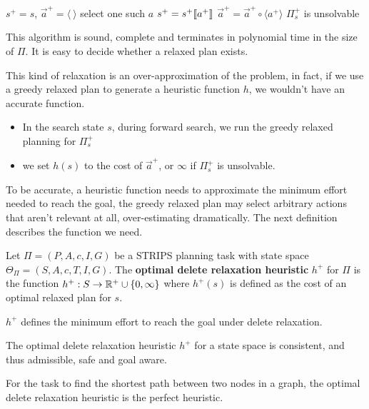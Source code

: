 \documentclass[10pt, letterpaper]{report}
\begin{document}
\begin{algorithm}
\caption{Greedy Relaxed Planning}\label{alg:relaxed_planning}
\begin{algorithmic}[1]
\State $s^+=s$, $\vec a^+=\langle \ \rangle$
\State select one such $a$
\State $s^+=s^+\llbracket a^+ \rrbracket$
\State $\vec a^+=\vec a^+\circ \langle a^+\rangle$
\Else
\State\Return $\Pi^+_s$ is unsolvable
\EndIf
\EndWhile
\end{algorithmic}
\end{algorithm}

This algorithm is sound,  complete and terminates in polynomial time in the size of $\Pi$. It is easy to decide whether a relaxed plan exists.\bigskip

This kind of relaxation is an over-approximation of the problem, in fact, if we use a greedy relaxed plan to generate a heuristic function $h$, we wouldn't have an accurate function.\begin{itemize}
    \item In the search state $s$, during forward search, we run the greedy relaxed planning for $\Pi_s^+$
    \item we set $h(s)$ to the cost of $\vec a ^+$, or $\infty$ if $\Pi_s^+$ is unsolvable.
\end{itemize}
To be accurate, a heuristic function needs to approximate the minimum effort needed to reach the goal, the greedy relaxed plan may select arbitrary actions
 that aren't relevant at all, over-estimating dramatically. 
The next definition describes the function we need.
\begin{definition}
    Let $\Pi=(P,A,c,I,G)$ be a STRIPS planning task with state space $\Theta_\Pi=(S,A,c,T,I,G)$. The \textbf{optimal delete relaxation heuristic} $h^+$ for $\Pi$ is the function $h^+:S\rightarrow{\mathbb R}^+\cup\{0,\infty\}$ where $h^+(s)$ is defined as the cost of an optimal relaxed plan for $s$.
\end{definition}
$h^+$ defines the minimum effort to reach the goal under delete relaxation.
\begin{proposition}
   The optimal delete relaxation heuristic $h^+$ for a state space is consistent, and thus admissible, safe and goal aware.
\end{proposition}
\begin{proposition}
    For the task to find the shortest path between two nodes in a graph, the optimal delete relaxation heuristic is the perfect heuristic.
\end{proposition}
\end{document}

